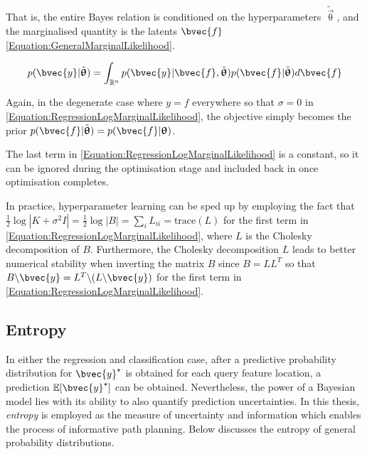 				That is, the entire Bayes relation is conditioned on the hyperparameters $\tilde{\vec{\uptheta}}$, and the marginalised quantity is the latents $\bvec{f}$ \eqref{Equation:GeneralMarginalLikelihood}.
				
				\begin{equation}
					p(\bvec{y} | \tilde{\vec{\uptheta}}) = \int_{\mathbb{R}^{n}} p(\bvec{y} | \bvec{f}, \tilde{\vec{\uptheta}}) p(\bvec{f} | \tilde{\vec{\uptheta}}) d\bvec{f}
				\label{Equation:GeneralMarginalLikelihood}
				\end{equation}
				
				Again, in the degenerate case where $y = f$ everywhere so that $\sigma = 0$ in \eqref{Equation:RegressionLogMarginalLikelihood}, the objective simply becomes the prior $p(\bvec{f} | \tilde{\vec{\uptheta}}) = p(\bvec{f} | \vec{\uptheta})$.
				
				The last term in \eqref{Equation:RegressionLogMarginalLikelihood} is a constant, so it can be ignored during the optimisation stage and included back in once optimisation completes.
				
				In practice, hyperparameter learning can be sped up by employing the fact that $\frac{1}{2} \log|K + \sigma^{2} I| = \frac{1}{2} \log|B| = \sum_{i} L_{ii} = \mathrm{trace}(L)$ for the first term in \eqref{Equation:RegressionLogMarginalLikelihood}, where $L$ is the Cholesky decomposition of $B$. Furthermore, the Cholesky decomposition $L$ leads to better numerical stability when inverting the matrix $B$ since $B = LL^{T}$ so that $B \backslash \bvec{y} = L^{T} \backslash (L \backslash \bvec{y})$ for the first term in \eqref{Equation:RegressionLogMarginalLikelihood}.
		
		\subsection{Entropy}
		\label{Background:GaussianProcesses:Entropy}
		
			In either the regression and classification case, after a predictive probability distribution for $\bvec{y}^{\star}$ is obtained for each query feature location, a prediction $\mathbb{E}[\bvec{y}^{\star}]$ can be obtained. Nevertheless, the power of a Bayesian model lies with its ability to also quantify prediction uncertainties. In this thesis, \textit{entropy} is employed as the measure of uncertainty and information which enables the process of informative path planning. Below discusses the entropy of general probability distributions.
			
